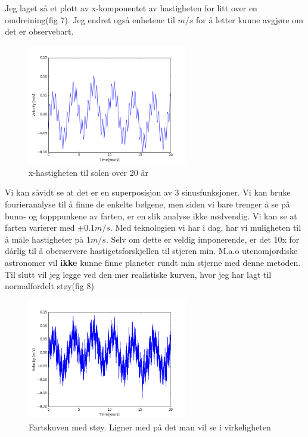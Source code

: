 \documentclass[a4paper,norsk,11pt,twoside]{article}
\begin{document}
Jeg laget så et plott av x-komponentet av hastigheten for litt over en omdreining(fig 7). Jeg endret også enhetene til $m/s$ for å letter kunne avgjøre om det er observebart.

\begin{figure}[hbt]
\begin{center}
\includegraphics[width=70mm]{vel_no_noice.png}
\caption{x-hastigheten til solen over 20 år}\label{fig:finfigur}
\end{center}
\end{figure}

Vi kan såvidt se at det er en superposisjon av 3 sinusfunksjoner. Vi kan bruke fourieranalyse til å finne de enkelte bølgene, men siden vi bare trenger å se på bunn- og topppunkene av farten, er en slik analyse ikke nødvendig. Vi kan se at farten varierer med $\pm 0.1 m/s$. Med teknologien vi har i dag, har vi muligheten til å måle hastigheter på $1 m/s$. Selv om dette er veldig imponerende, er det 10x for dårlig til å oberservere hastigetsforskjellen til stjeren min. M.a.o utenomjordiske astronomer vil \textbf{ikke} kunne finne planeter rundt min stjerne med denne metoden.\\

Til slutt vil jeg legge ved den mer realistiske kurven, hvor jeg har lagt til normalfordelt støy(fig 8)

\begin{figure}[hbt]
\begin{center}
\includegraphics[width= 70mm]{vel_noice.png}
\caption{Fartskuven med støy. Ligner med på det man vil se i virkeligheten}\label{fig:finfigur}
\end{center}
\end{figure}
\end{document}

